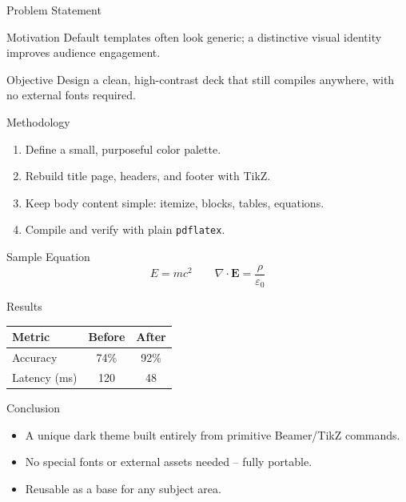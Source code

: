 \documentclass[aspectratio=169]{beamer}
\begin{document}
\begin{frame}{Problem Statement}
\begin{block}{Motivation}
Default templates often look generic; a distinctive visual identity improves audience engagement.
\end{block}
\begin{block}{Objective}
Design a clean, high-contrast deck that still compiles anywhere, with no external fonts required.
\end{block}
\end{frame}

\begin{frame}{Methodology}
\begin{enumerate}
  \item Define a small, purposeful color palette.
  \item Rebuild title page, headers, and footer with TikZ.
  \item Keep body content simple: itemize, blocks, tables, equations.
  \item Compile and verify with plain \texttt{pdflatex}.
\end{enumerate}
\end{frame}

\begin{frame}{Sample Equation}
\[
E = mc^2 \qquad \nabla \cdot \mathbf{E} = \frac{\rho}{\varepsilon_0}
\]
\end{frame}

\begin{frame}{Results}
\begin{table}
\centering
\begin{tabular}{lcc}
\toprule
\textcolor{accent}{\textbf{Metric}} & \textcolor{accent}{\textbf{Before}} & \textcolor{accent}{\textbf{After}} \\
\midrule
Accuracy & 74\% & 92\% \\
Latency (ms) & 120 & 48 \\
\bottomrule
\end{tabular}
\end{table}
\end{frame}

\begin{frame}{Conclusion}
\begin{itemize}
  \item A unique dark theme built entirely from primitive Beamer/TikZ commands.
  \item No special fonts or external assets needed -- fully portable.
  \item Reusable as a base for any subject area.
\end{itemize}
\end{frame}

\begin{frame}[plain]
\end{frame}
\end{document}

